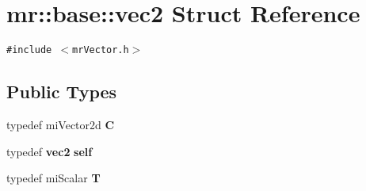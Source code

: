 \section{mr::base::vec2 Struct Reference}
\label{structmr_1_1base_1_1vec2}
{\tt \#include $<$mr\-Vector.h$>$}

\subsection*{Public Types}
\begin{CompactItemize}
\item 
typedef mi\-Vector2d {\bf C}
\item 
typedef {\bf vec2} {\bf self}
\item 
typedef mi\-Scalar {\bf T}
\end{CompactItemize}
